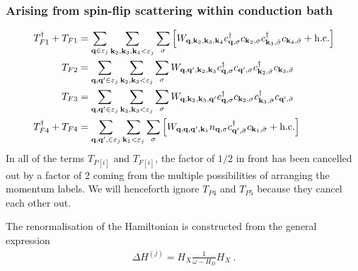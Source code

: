 \subsubsection*{Arising from spin-flip scattering within conduction bath}
\begin{equation}\begin{aligned}
	T_{F1}^\dagger + T_{F1} &= \sum_{{\bf q} \in \varepsilon_j}\sum_{{\bf k}_2, {\bf k}_3, {\bf k}_4 < \varepsilon_j}\sum_{\sigma} \left[W_{{\bf q},{\bf k}_2,{\bf k}_3,{\bf k}_4}c^\dagger_{{\bf q},\sigma}c_{{\bf k}_2,\sigma}c^\dagger_{{\bf k}_3,\bar\sigma}c_{{\bf k}_4,\bar\sigma} + \text{h.c.}\right]\\
	T_{F2} &= \sum_{{\bf q}, {\bf q}^\prime \in \varepsilon_j}\sum_{{\bf k}_2, {\bf k}_3 < \varepsilon_j}\sum_{\sigma}W_{{\bf q},{\bf q}^\prime,{\bf k}_2,{\bf k}_3} c^\dagger_{{\bf q},\sigma}c_{{\bf q}^\prime,\sigma}c^\dagger_{{\bf k}_2,\bar\sigma}c_{{\bf k}_3,\bar\sigma}\\
	T_{F3} &= \sum_{{\bf q}, {\bf q}^\prime \in \varepsilon_j}\sum_{{\bf k}_2, {\bf k}_3 < \varepsilon_j}\sum_{\sigma} W_{{\bf q},{\bf k}_2,{\bf k}_3,{\bf q}^\prime} c^\dagger_{{\bf q},\sigma}c_{{\bf k}_2,\sigma}c^\dagger_{{\bf k}_3,\bar\sigma}c_{{\bf q}^\prime,\bar\sigma} \\
	T_{F4}^\dagger + T_{F4} &= \sum_{{\bf q}, {\bf q}^\prime, \in \varepsilon_j}\sum_{{\bf k}_1 < \varepsilon_j}\sum_{\sigma} \left[W_{{\bf q},{\bf q},{\bf q}^{\prime}, {\bf k}_1} n_{{\bf q},\sigma} c^\dagger_{{\bf q}^{\prime},\bar\sigma}c_{{\bf k}_1,\bar\sigma} + \text{h.c.}\right]
\end{aligned}\end{equation}
In all of the terms \(T_{P[i]}\) and \(T_{F[i]}\), the factor of \(1/2\) in front has been cancelled out by a factor of 2 coming from the multiple possibilities of arranging the momentum labels. We will henceforth ignore \(T_{P4}\) and \(T_{P5}\) because they cancel each other out.

The renormalisation of the Hamiltonian is constructed from the general expression
\begin{equation}\begin{aligned}
	\Delta H^{(j)} = H_X \frac{1}{\omega- H_D} H_X~.
\end{aligned}\end{equation}

